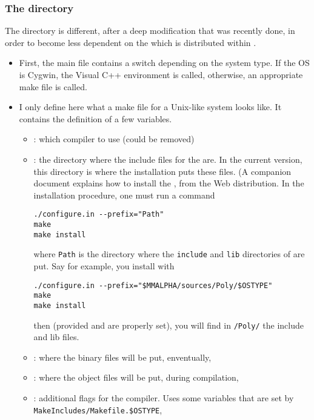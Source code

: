 \documentclass[11pt]{article}
\begin{document}
\subsubsection{The \domlib{} directory}
\label{domlib}
The \domlib{} directory is different, after a deep modification that was
recently done, in order to become less dependent on the \polylib{}
which is distributed within \mmalfa{}.
\begin{itemize}
\item First, the main \makefile{} file contains a switch depending on the
system type. If the OS is Cygwin, the Visual C++ environment is called, 
otherwise, an appropriate make file is called. 
\item I only define here what a make file for a Unix-like system looks like.
It contains the definition of a few variables.
\begin{itemize}
\item \varcc{}: which compiler to use (could be removed)
\item \varpolyinclude{}: the directory where the include files for the \polylib{}
are. In the current version, this directory is where the \polylib{} installation 
puts these files. (A companion document explains how to install the \polylib{}, 
from the Web distribution. In the installation procedure, one must 
run a command
\begin{verbatim}
./configure.in --prefix="Path"
make
make install
\end{verbatim}
where \texttt{Path} is the directory where the \texttt{include} and \texttt{lib}
directories of \polylib{} are put. Say for example, you install 
\polylib{} with 
\begin{verbatim}
./configure.in --prefix="$MMALPHA/sources/Poly/$OSTYPE"
make
make install
\end{verbatim}
then (provided \envmmalpha{} and \envostype{} are properly set), 
you will find in \sources{}\texttt{/Poly/}\envostype{} the include
and lib files.
\item \varbindir{}: where the binary files will be put, enventually,
\item \varobjdir{}: where the object files will be put, during compilation,
\item \varextraflags{}: additional flags for the compiler. Uses some
variables that are set by \texttt{MakeIncludes/Makefile.\$OSTYPE},
\end{itemize}

\end{itemize}
\end{document}
